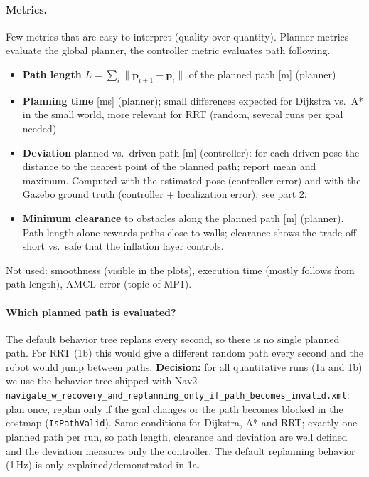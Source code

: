 \documentclass[10pt]{article}
\newcommand{\pkg}[1]{\texttt{#1}}
\begin{document}
\paragraph{Metrics.} Few metrics that are easy to interpret (quality over quantity).
Planner metrics evaluate the global planner, the controller metric evaluates path following.
\begin{itemize}
  \item \textbf{Path length} $L = \sum_i \lVert \mathbf{p}_{i+1} - \mathbf{p}_i \rVert$ of the planned path [m] (planner)
  \item \textbf{Planning time} [ms] (planner); small differences expected for Dijkstra vs.\ A*
        in the small world, more relevant for RRT (random, several runs per goal needed)
  \item \textbf{Deviation} planned vs.\ driven path [m] (controller): for each driven pose the
        distance to the nearest point of the planned path; report mean and maximum.
        Computed with the estimated pose (controller error) and with the Gazebo ground truth
        (controller + localization error), see part 2.
  \item \textbf{Minimum clearance} to obstacles along the planned path [m] (planner).
        Path length alone rewards paths close to walls; clearance shows the trade-off
        short vs.\ safe that the inflation layer controls.
\end{itemize}
Not used: smoothness (visible in the plots), execution time (mostly follows from path
length), AMCL error (topic of MP1).

\paragraph{Which planned path is evaluated?} The default behavior tree replans every second,
so there is no single planned path. For RRT (1b) this would give a different random path every
second and the robot would jump between paths.
\textbf{Decision:} for all quantitative runs (1a and 1b) we use the behavior tree shipped with Nav2
\pkg{navigate\_w\_recovery\_and\_replanning\_only\_if\_path\_becomes\_invalid.xml}: plan once,
replan only if the goal changes or the path becomes blocked in the costmap (\pkg{IsPathValid}).
Same conditions for Dijkstra, A* and RRT; exactly one planned path per run, so path length,
clearance and deviation are well defined and the deviation measures only the controller.
The default replanning behavior (1\,Hz) is only explained/demonstrated in 1a.
\end{document}
